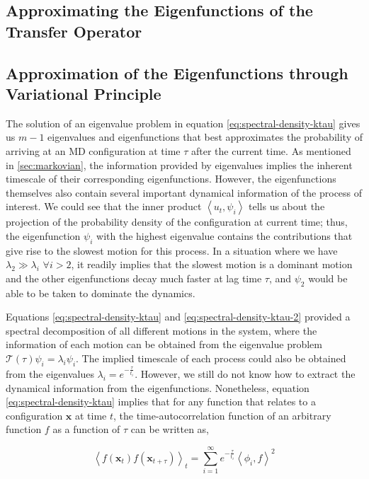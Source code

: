 \begin{spacing}{2.0}
    \section{Approximating the Eigenfunctions of the Transfer Operator}

    \subsection{Approximation of the Eigenfunctions through Variational Principle}

    The solution of an eigenvalue problem in equation \ref{eq:spectral-density-ktau} gives us $m-1$ eigenvalues and eigenfunctions that best 
    approximates the probability of arriving at an MD configuration at time $\tau$ after the current time. As mentioned in \ref{sec:markovian},
    the information provided by eigenvalues implies the inherent timescale of their corresponding eigenfunctions. However, the eigenfunctions 
    themselves also contain several important dynamical information of the process of interest. We could see that the inner product
    $\left<u_t,\psi_i\right>$ tells us about the projection of the probability density of the configuration at current time; thus, the 
    eigenfunction $\psi_i$ with the highest eigenvalue contains the contributions that give rise to the slowest motion for this process. 
    In a situation where we have $\lambda_2 \gg \lambda_i\,\,\forall i > 2$, it readily implies that the slowest motion is a dominant motion and 
    the other eigenfunctions decay much faster at lag time $\tau$, and $\psi_2$ would be able to be taken to dominate the dynamics.

    Equations \ref{eq:spectral-density-ktau} and \ref{eq:spectral-density-ktau-2} provided a spectral decomposition of all different motions in 
    the system, where the information of each motion can be obtained from the eigenvalue problem $\mathcal{T}(\tau)\psi_i = \lambda_i\psi_i$.
    The implied timescale of each process could also be obtained from the eigenvalues $\lambda_i = e^{-\frac{\tau}{t_i}}$. However, we still do 
    not know how to extract the dynamical information from the eigenfunctions. Nonetheless, equation \ref{eq:spectral-density-ktau} implies
    that for any function that relates to a configuration $\mathbf{x}$ at time $t$, the time-autocorrelation function of an arbitrary function
    $f$ as a function of $\tau$ can be written as,

    \begin{equation}
        \left<f(\mathbf{x}_t) f(\mathbf{x}_{t+\tau})\right>_t = \sum_{i=1}^{\infty} e^{-\frac{\tau}{t_i}} \left<\phi_i, f\right>^2
        \label{eq:autocorrelation-function}
    \end{equation}


\end{spacing}
